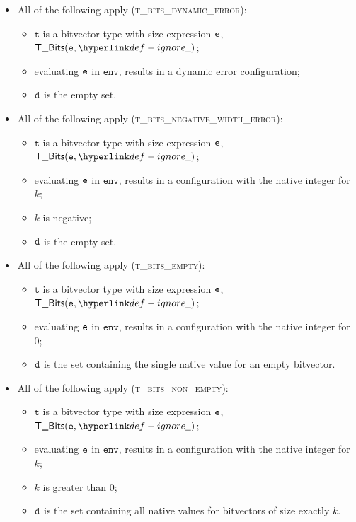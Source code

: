 \documentclass{book}
\newcommand\env[0]{\texttt{env}}
\newcommand\vt[0]{\texttt{t}}
\begin{document}
\begin{itemize}
  \item All of the following apply (\textsc{t\_bits\_dynamic\_error}):
  \begin{itemize}
    \item $\vt$ is a bitvector type with size expression $\texttt{e}$, $\TBits(\ve, \Ignore)$;
    \item evaluating $\texttt{e}$ in $\env$, results in a dynamic error configuration;
    \item $\texttt{d}$ is the empty set.
  \end{itemize}

  \item All of the following apply (\textsc{t\_bits\_negative\_width\_error}):
  \begin{itemize}
    \item $\vt$ is a bitvector type with size expression $\texttt{e}$, $\TBits(\ve, \Ignore)$;
    \item evaluating $\texttt{e}$ in $\env$, results in a configuration with the native integer for $k$;
    \item $k$ is negative;
    \item $\texttt{d}$ is the empty set.
  \end{itemize}

  \item All of the following apply (\textsc{t\_bits\_empty}):
  \begin{itemize}
    \item $\vt$ is a bitvector type with size expression $\texttt{e}$, $\TBits(\ve, \Ignore)$;
    \item evaluating $\texttt{e}$ in $\env$, results in a configuration with the native integer for $0$;
    \item $\texttt{d}$ is the set containing the single native value for an empty bitvector.
  \end{itemize}

  \item All of the following apply (\textsc{t\_bits\_non\_empty}):
  \begin{itemize}
    \item $\vt$ is a bitvector type with size expression $\texttt{e}$, $\TBits(\ve, \Ignore)$;
    \item evaluating $\texttt{e}$ in $\env$, results in a configuration with the native integer for $k$;
    \item $k$ is greater than $0$;
    \item $\texttt{d}$ is the set containing all native values for bitvectors of size exactly $k$.
  \end{itemize}


\end{itemize}
\end{document}
